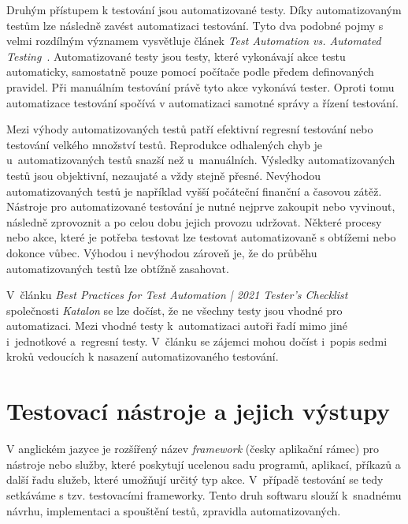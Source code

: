 Druhým přístupem k testování jsou automatizované testy. Díky automatizovaným testům lze následně zavést automatizaci testování. Tyto dva podobné pojmy s velmi rozdílným významem vysvětluje článek \textit{Test Automation vs. Automated Testing}~\cite{TestAutomationVsAutomatedTesting}. Automatizované testy jsou testy, které vykonávají akce testu automaticky, samostatně pouze pomocí počítače podle předem definovaných pravidel. Při manuálním testování právě tyto akce vykonává tester.
Oproti tomu automatizace testování spočívá v automatizaci samotné správy a řízení testování.

Mezi výhody automatizovaných testů patří efektivní regresní testování nebo testování velkého množství testů. Reprodukce odhalených chyb je u~automatizovaných testů snazší než u~manuálních. Výsledky automatizovaných testů jsou objektivní, nezaujaté a vždy stejně přesné. Nevýhodou automatizovaných testů je například vyšší počáteční finanční a časovou zátěž. Nástroje pro automatizované testování je nutné nejprve zakoupit nebo vyvinout, následně zprovoznit a po celou dobu jejich provozu udržovat. Některé procesy nebo akce, které je potřeba testovat lze testovat automatizovaně s obtížemi nebo dokonce vůbec. Výhodou i nevýhodou zároveň je, že do průběhu automatizovaných testů lze obtížně zasahovat.

V~článku \textit{Best Practices for Test Automation | 2021 Tester’s Checklist}~\cite{BestPracticesForTestAutomation}
společnosti \textit{Katalon} se lze dočíst, že ne všechny testy jsou vhodné pro automatizaci. Mezi vhodné testy
k~automatizaci autoři řadí mimo jiné i~jednotkové a~regresní testy. V~článku se zájemci mohou dočíst i~popis sedmi
kroků vedoucích k nasazení automatizovaného testování.


\chapter{Testovací nástroje a jejich výstupy}
\label{chapter:testovaci_nastroje}
V anglickém jazyce je rozšířený název \textit{framework} (česky aplikační rámec) pro nástroje nebo služby, které
poskytují ucelenou sadu programů, aplikací, příkazů a další řadu služeb, které umožňují určitý typ akce. V~případě
testování se tedy setkáváme s tzv. testovacími frameworky. Tento druh softwaru slouží k~snadnému návrhu,
implementaci a spouštění testů, zpravidla automatizovaných.

